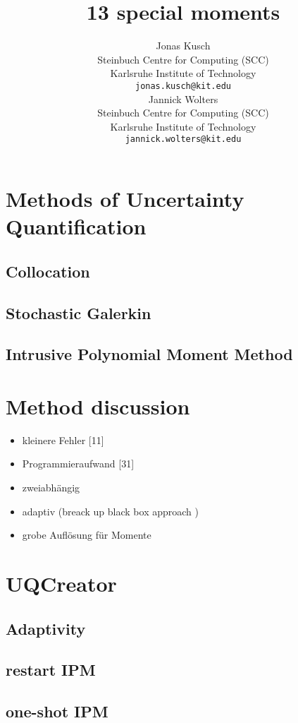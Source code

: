 \documentclass{article}
\title{13 special moments}
\author{
  Jonas Kusch\\
  Steinbuch Centre for Computing (SCC)\\
  Karlsruhe Institute of Technology\\
  \texttt{jonas.kusch@kit.edu} \\
  \And
  Jannick Wolters\\
  Steinbuch Centre for Computing (SCC)\\
  Karlsruhe Institute of Technology\\
  \texttt{jannick.wolters@kit.edu} \\ 
}
\begin{document}
\maketitle

\begin{abstract}
\lipsum[1]
\end{abstract}


\section{Methods of Uncertainty Quantification}
\subsection{Collocation}
\subsection{Stochastic Galerkin}
\subsection{Intrusive Polynomial Moment Method}
\section{Method discussion}
\begin{itemize}
	\item kleinere Fehler [11]
	\item Programmieraufwand [31]
	\item zweiabhängig
	\item adaptiv (breack up black box approach )
	\item grobe Auflösung für Momente 
\end{itemize}
\section{UQCreator}
\subsection{Adaptivity}
\subsection{restart IPM} %
\subsection{one-shot IPM}
\end{document}

